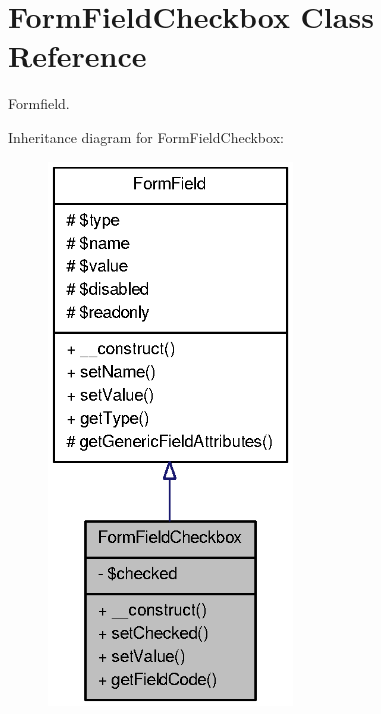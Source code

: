 \section{FormFieldCheckbox Class Reference}
\label{classFormFieldCheckbox}


Formfield.  




Inheritance diagram for FormFieldCheckbox:\nopagebreak
\begin{figure}[H]
\begin{center}
\leavevmode
\includegraphics[width=184pt]{classFormFieldCheckbox__inherit__graph}
\end{center}
\end{figure}



